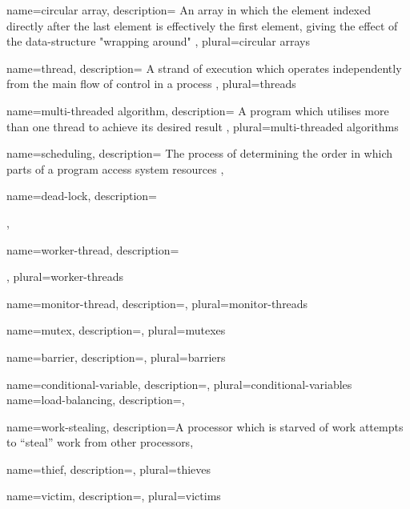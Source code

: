 {
    name={circular array},
    description={
        An array in which the element indexed directly after the last element 
        is effectively the first element, giving the effect of the 
        data-structure "wrapping around"
    },
    plural={circular arrays}
}

{
    name={thread},
    description={
        A strand of execution which operates independently from the main flow of
        control in a process
    },
    plural={threads}
}

{
    name={multi-threaded algorithm},
    description={
        A program which utilises more than one thread to achieve its desired 
        result
    },
    plural={multi-threaded algorithms}
}

{
    name={scheduling},
    description={
        The process of determining the order in which parts of a program access
        system resources
    },    
}

{
    name={dead-lock},
    description={
        
    },
}

{
    name={worker-thread},
    description={
    
    },
    plural={worker-threads}
}

{
    name={monitor-thread},
    description={},
    plural={monitor-threads}
}

{
    name={mutex},
    description={},
    plural={mutexes}
}

{
    name={barrier},
    description={},
    plural={barriers}
}

{
    name={conditional-variable},
    description={},
    plural={conditional-variables}
}
{
    name={load-balancing},
    description={},
}

{
    name={work-stealing},
    description={A processor which is starved of work attempts to ``steal'' 
                 work from other processors},
}

{
    name={thief},
    description={},
    plural={thieves}
}

{
    name={victim},
    description={},
    plural={victims}
}

